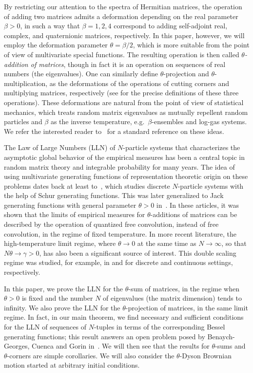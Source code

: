 \documentclass[11pt]{article}
\theoremstyle{plain}
\begin{document}
By restricting our attention to the spectra of Hermitian matrices, the operation of adding two matrices admits a deformation depending on the real parameter $\beta>0$, in such a way that $\beta=1,2,4$ correspond to adding self-adjoint real, complex, and quaternionic matrices, respectively.
In this paper, however, we will employ the deformation parameter $\theta=\beta/2$, which is more suitable from the point of view of multivariate special functions.
The resulting operation is then called \emph{$\theta$-addition of matrices}, though in fact it is an operation on sequences of real numbers (the eigenvalues).
One can similarly define $\theta$-projection and $\theta$-multiplication, as the deformations of the operations of cutting corners and multiplying matrices, respectively (see \cite{GM20} for the precise definitions of these three operations).
These deformations are natural from the point of view of statistical mechanics, which treats random matrix eigenvalues as mutually repellent random particles and  $\beta$ as the inverse temperature, e.g.~$\beta$-ensembles and log-gas systems. We refer the interested reader to~\cite{Forrester} for a standard reference on these ideas.

The Law of Large Numbers (LLN) of $N$-particle systems that characterizes the asymptotic global behavior of the empirical measures has been a central topic in random matrix theory and integrable probability for many years.
The idea of using multivariate generating functions of representation theoretic origin on these problems dates back at least to~\cite{BuG15}, which studies discrete $N$-particle systems with the help of Schur generating functions.
This was later generalized to Jack generating functions with general parameter $\theta>0$ in~\cite{Hua21}.
In these articles, it was shown that the limits of empirical measures for $\theta$-additions of matrices can be described by the operation of quantized free convolution, instead of free convolution, in the regime of fixed temperature.
In more recent literature, the high-temperature limit regime, where $\theta\to 0$ at the same time as $N\rightarrow\infty$, so that $N\theta\rightarrow\gamma>0$, has also been a significant source of interest.
This double scaling regime was studied, for example, in \cite{CuD25(1), CuD25(2), CDM} and \cite{BCG} for discrete and continuous settings, respectively. 

In this paper, we prove the LLN for the $\theta$-sum of matrices, in the regime when $\theta>0$ is fixed and the number $N$ of eigenvalues (the matrix dimension) tends to infinity.
We also prove the LLN for the $\theta$-projection of matrices, in the same limit regime.
In fact, in our main theorem, we find necessary and sufficient conditions for the LLN of sequences of $N$-tuples in terms of the corresponding Bessel generating functions; this result answers an open problem posed by Benaych-Georges, Cuenca and Gorin in~\cite{BCG}.
We will then see that the results for $\theta$-sums and $\theta$-corners are simple corollaries.
We will also consider the $\theta$-Dyson Brownian motion started at arbitrary initial conditions.
\end{document}
